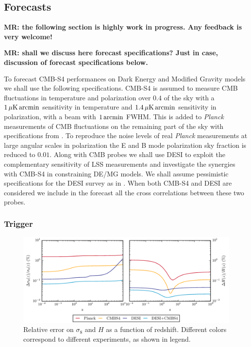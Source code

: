 %

%
\subsection{Forecasts}
%

{\bf MR: the following section is highly work in progress. Any feedback is very welcome!}

{\bf MR: shall we discuss here forecast specifications? Just in case, discussion of forecast specifications below.}

To forecast CMB-S4 performances on Dark Energy and Modified Gravity models we shall use the following specifications.
CMB-S4 is assumed to measure CMB fluctuations in temperature and polarization over $0.4$ of the sky with a $1\,\mu {\rm K} \, {\rm arcmin}$ sensitivity in temperature and $1.4\,\mu {\rm K} \, {\rm arcmin}$ sensitivity in polarization, with a beam with $1\, {\rm arcmin}$ FWHM.
This is added to {\it Planck} measurements of CMB fluctuations on the remaining part of the sky with specifications from \cite{Adam:2015rua}. To reproduce the noise levels of real {\it Planck} measurements at large angular scales in polarization the E and B mode polarization sky fraction is reduced to $0.01$.
Along with CMB probes we shall use DESI to exploit the complementary sensitivity of LSS measurements and investigate the synergies with CMB-S4 in constraining DE/MG models.
We shall assume pessimistic specifications for the DESI survey as in \cite{Font-Ribera:2013rwa}.
When both CMB-S4 and DESI are considered we include in the forecast all the cross correlations between these two probes.

\subsubsection{Trigger}

\begin{figure}[!tb]
\begin{center}
\includegraphics[width=1.0\textwidth]{DarkEnergy/1_Thomographic}
\caption{Relative error on $\sigma_{8}$ and $H$ as a function of redshift. Different colors correspond to different experiments, as shown in legend.}\label{fig:GrowthExpansion}
\end{center}
\end{figure}

